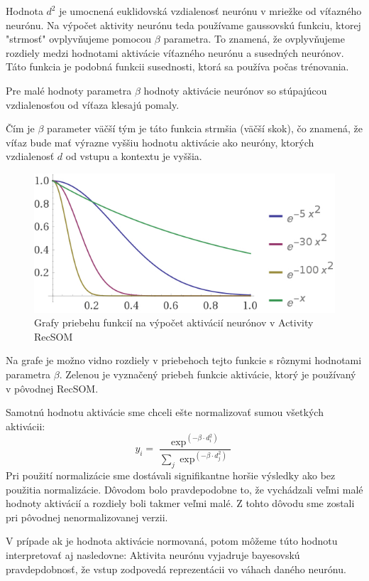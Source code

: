 Hodnota $d^2$ je umocnená euklidovská vzdialenosť neurónu v mriežke od víťazného neurónu.
Na výpočet aktivity neurónu teda používame gaussovskú funkciu, ktorej "strmosť" ovplyvňujeme
pomocou $\beta$ parametra. To znamená, že ovplyvňujeme rozdiely medzi hodnotami aktivácie víťazného neurónu
a susedných neurónov. Táto funkcia je podobná funkcii susednosti, ktorá sa používa počas trénovania. 

Pre malé hodnoty parametra $\beta$ hodnoty aktivácie neurónov so stúpajúcou vzdialenosťou od víťaza
klesajú pomaly. 

Čím je $\beta$ parameter väčší tým je táto funkcia strmšia (väčší skok), čo znamená, že víťaz bude mať výrazne vyššiu hodnotu aktivácie
ako neuróny, ktorých vzdialenosť $d$ od vstupu a kontextu je vyššia.

\begin{figure}[H]
    \centering
    \includegraphics[width=\textwidth]{assets/plots}
    \caption{Grafy priebehu funkcií na výpočet aktivácií neurónov v Activity RecSOM}
\end{figure}
Na grafe je možno vidno rozdiely v priebehoch tejto funkcie s rôznymi hodnotami parametra $\beta$. Zelenou 
je vyznačený priebeh funkcie aktivácie, ktorý je používaný v pôvodnej RecSOM.

Samotnú hodnotu aktivácie sme chceli ešte normalizovať sumou všetkých aktivácii:
\begin{equation}
    y_{i} = \frac{\exp^{(-\beta \cdot d_{i}^{2})}}{\sum_{j} \exp^{(-\beta \cdot d_{j}^{2})}}
\end{equation}
Pri použití normalizácie sme dostávali signifikantne horšie výsledky
ako bez použitia normalizácie. Dôvodom bolo pravdepodobne to, že vychádzali veľmi malé
hodnoty aktivácií a rozdiely boli takmer veľmi malé. Z tohto dôvodu sme zostali 
pri pôvodnej nenormalizovanej verzii.

V prípade ak je hodnota aktivácie normovaná, potom môžeme túto
hodnotu interpretovať aj nasledovne:
Aktivita neurónu vyjadruje bayesovskú pravdepdobnosť, že vstup zodpovedá reprezentácii vo váhach daného neurónu.

